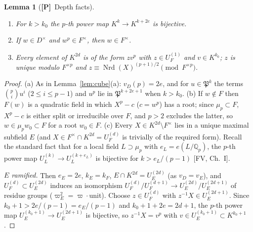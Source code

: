 \documentclass[11pt]{article}
\newcommand{\Q}{\mathbb Q}
\newcommand{\Nrd}{\operatorname{Nrd}}
\newcommand{\Pfr}{\mathfrak P}
\newcommand{\Ptag}{\textnormal{\textbf{[P]}}}
\theoremstyle{plain}
\newtheorem{lemma}[theorem]{Lemma}
\theoremstyle{definition}
\begin{document}
\begin{lemma}[\Ptag\ Depth facts]\label{lem:depth-gen}
\begin{enumerate}[label=(\alph*)]
\item For $k>k_0$ the $p$-th power map $K^k\to K^{k+2e}$ is bijective.
\item If $w\in D^\times$ and $w^p\in F^\times$, then $w\in F^\times$.
\item Every element of $K^{2d}$ is of the form $zv^p$ with
$z\in U_F^{(1)}$ and $v\in K^{k_0}$; $z$ is unique modulo $F^{\times p}$
and $z\equiv\Nrd(X)^{(p+1)/2}\pmod{F^{\times p}}$.
\end{enumerate}
\end{lemma}
\begin{proof}
(a) As in Lemma~\ref{lem:cube}(a): $v_D(p)=2e$, and for $u\in\Pfr^k$ the
terms $\binom pi u^i$ ($2\le i\le p-1$) and $u^p$ lie in $\Pfr^{k+2e+1}$
when $k>k_0$.  (b) If $w\notin F$ then $F(w)$ is a quadratic field in
which $X^p-c$ ($c=w^p$) has a root; since $\mu_p\subset F$, $X^p-c$ is
either split or irreducible over $F$, and $p>2$ excludes the latter, so
$w\in\mu_pw_0\subset F$ for a root $w_0\in F$.  (c) Every $X\in K^{2d}\setminus F^\times$
lies in a unique maximal subfield $E$ (and $X\in F^\times\cap K^{2d}=U_F^{(d)}$
is trivially of the required form).  Recall the standard fact that for a
local field $L\supset\mu_p$ with $e_L=e(L/\Q_p)$, the $p$-th power map
$U^{(k)}_L\to U^{(k+e_L)}_L$ is bijective for $k>e_L/(p-1)$ [FV, Ch.~I].

\emph{$E$ ramified.}  Then $e_E=2e$, $k_E=k_F$, $E\cap K^{2d}=U_E^{(2d)}$
(as $v_D=v_E$), and $U_F^{(d)}\subset U_E^{(2d)}$ induces an isomorphism
$U_F^{(d)}/U_F^{(d+1)}\to U_E^{(2d)}/U_E^{(2d+1)}$ of residue groups
($\varpi_E^2=\varpi\cdot$unit).  Choose $z\in U_F^{(d)}$ with
$z^{-1}X\in U_E^{(2d+1)}$.  Since $k_0+1>2e/(p-1)=e_E/(p-1)$ and
$k_0+1+2e=2d+1$, the $p$-th power map $U_E^{(k_0+1)}\to U_E^{(2d+1)}$ is
bijective, so $z^{-1}X=v^p$ with $v\in U_E^{(k_0+1)}\subset K^{k_0+1}$.


\end{proof}
\end{document}

